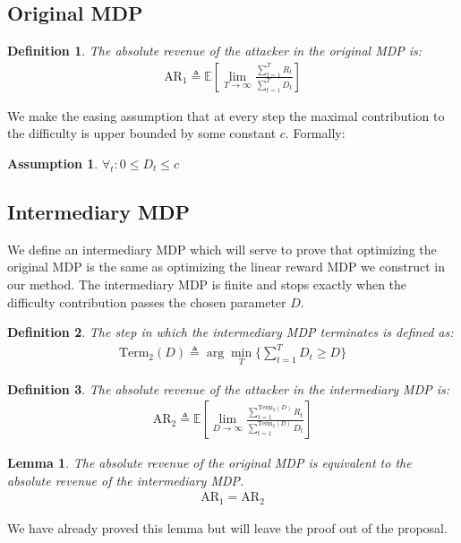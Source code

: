 \documentclass{article}
\newcommand{\E}[1]{\mathbb{E} \left[ #1 \right]}
\newtheorem{definition}{Definition}
\newtheorem{lemma}[theorem]{Lemma}
\newtheorem{assumption}{Assumption}
\begin{document}
\subsection{Original MDP}
\begin{definition}
    The absolute revenue of the attacker in the original MDP is:
    \begin{gather*}
        \text{AR}_1 \triangleq \E{\lim\limits_{T\to\infty} \frac{\sum\limits_{t=1}^T R_t}{\sum\limits_{t=1}^T D_t}}
    \end{gather*}
\end{definition}
We make the easing assumption that at every step the maximal contribution to the difficulty is upper bounded by some constant $c$. Formally:
\begin{assumption}
    $\forall_t : 0 \leq D_t \leq c$
\end{assumption}

\subsection{Intermediary MDP}
We define an intermediary MDP which will serve to prove that optimizing the original MDP is the same as optimizing the linear reward MDP we construct in our method. The intermediary MDP is finite and stops exactly when the difficulty contribution passes the chosen parameter $D$.
\begin{definition}
    The step in which the intermediary MDP terminates is defined as:
    \begin{gather*}
        \text{Term}_2(D) \triangleq \arg \min\limits_T \{ \sum\limits_{t=1}^T D_t \geq D \}
    \end{gather*}
\end{definition}
\begin{definition}
    The absolute revenue of the attacker in the intermediary MDP is:
    \begin{gather*}
         \text{AR}_2 \triangleq \E{\lim\limits_{D\to\infty} \frac{\sum\limits_{t=1}^{\text{Term}_2(D)} R_t}{\sum\limits_{t=1}^{\text{Term}_2(D)} D_t}}
    \end{gather*}
\end{definition}
\begin{lemma}\label{inter_orig_ar_eq}
    The absolute revenue of the original MDP is equivalent to the absolute revenue of the intermediary MDP.
    \begin{gather*}
        \text{AR}_1 = \text{AR}_2
    \end{gather*}
\end{lemma}
We have already proved this lemma but will leave the proof out of the proposal.
\end{document}
